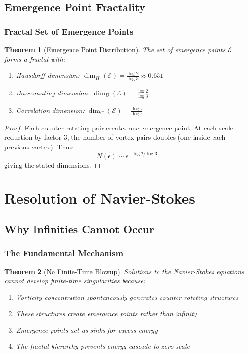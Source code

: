 \documentclass[12pt]{article}
\newtheorem{theorem}{Theorem}[section]
\begin{document}
\subsection{Emergence Point Fractality}

\subsubsection{Fractal Set of Emergence Points}

\begin{theorem}[Emergence Point Distribution]
The set of emergence points $\mathcal{E}$ forms a fractal with:
\begin{enumerate}
\item Hausdorff dimension: $\dim_H(\mathcal{E}) = \frac{\log 2}{\log 3} \approx 0.631$
\item Box-counting dimension: $\dim_B(\mathcal{E}) = \frac{\log 2}{\log 3}$
\item Correlation dimension: $\dim_C(\mathcal{E}) = \frac{\log 2}{\log 3}$
\end{enumerate}
\end{theorem}

\begin{proof}
Each counter-rotating pair creates one emergence point. At each scale reduction by factor 3, the number of vortex pairs doubles (one inside each previous vortex). Thus:
\begin{equation}
N(\epsilon) \sim \epsilon^{-\log 2/\log 3}
\end{equation}
giving the stated dimensions.
\end{proof}

\section{Resolution of Navier-Stokes}

\subsection{Why Infinities Cannot Occur}

\subsubsection{The Fundamental Mechanism}

\begin{theorem}[No Finite-Time Blowup]
Solutions to the Navier-Stokes equations cannot develop finite-time singularities because:
\begin{enumerate}
\item Vorticity concentration spontaneously generates counter-rotating structures
\item These structures create emergence points rather than infinity
\item Emergence points act as sinks for excess energy
\item The fractal hierarchy prevents energy cascade to zero scale
\end{enumerate}
\end{theorem}
\end{document}
